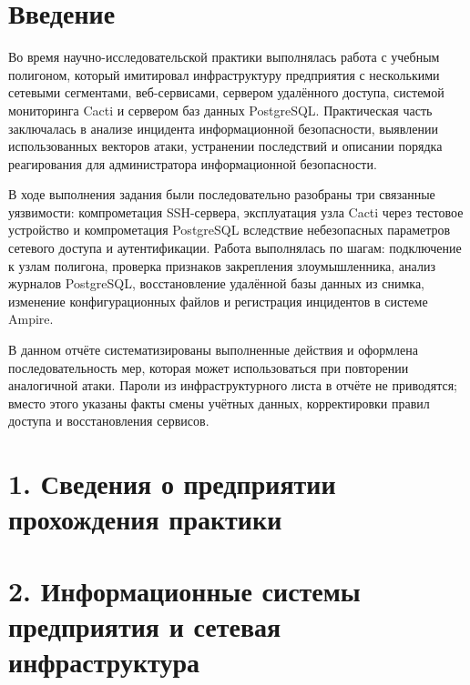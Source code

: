 \documentclass[14pt]{extarticle}
\begin{document}
\setcounter{page}{2}

\tableofcontents
\clearpage

\section*{Введение}

Во время научно-исследовательской практики выполнялась работа с учебным полигоном, который имитировал инфраструктуру предприятия с несколькими сетевыми сегментами, веб-сервисами, сервером удалённого доступа, системой мониторинга Cacti и сервером баз данных PostgreSQL. Практическая часть заключалась в анализе инцидента информационной безопасности, выявлении использованных векторов атаки, устранении последствий и описании порядка реагирования для администратора информационной безопасности.

В ходе выполнения задания были последовательно разобраны три связанные уязвимости: компрометация SSH-сервера, эксплуатация узла Cacti через тестовое устройство и компрометация PostgreSQL вследствие небезопасных параметров сетевого доступа и аутентификации. Работа выполнялась по шагам: подключение к узлам полигона, проверка признаков закрепления злоумышленника, анализ журналов PostgreSQL, восстановление удалённой базы данных из снимка, изменение конфигурационных файлов и регистрация инцидентов в системе Ampire.

В данном отчёте систематизированы выполненные действия и оформлена последовательность мер, которая может использоваться при повторении аналогичной атаки. Пароли из инфраструктурного листа в отчёте не приводятся; вместо этого указаны факты смены учётных данных, корректировки правил доступа и восстановления сервисов.

\clearpage

\section*{1. Сведения о предприятии прохождения практики}


\clearpage

\section*{2. Информационные системы предприятия и сетевая инфраструктура}
\end{document}
